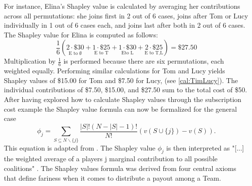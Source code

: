 \documentclass[12pt]{article}
\begin{document}
For instance, Elina's Shapley value is calculated by averaging her contributions across all permutations: she joins first in 2 out of 6 cases, joins after Tom or Lucy individually in 1 out of 6 cases each, and joins last after both in 2 out of 6 cases. The Shapley value for Elina is computed as follows:
$$
\frac{1}{6} \left( 
\underset{\text{E to } \emptyset}{2 \cdot \$30} + 
\underset{\text{E to T}}{1 \cdot \$25} + 
\underset{\text{Eto L}}{1 \cdot \$30} + 
\underset{\text{E to T,L}}{2 \cdot \$25} 
\right) = \$27.50
$$
Multiplication by $\frac{1}{6}$ is performed because there are six permutations, each weighted equally. Performing similar calculations for Tom and Lucy yields Shapley values of \$15.00 for Tom and \$7.50 for Lucy, (see \ref{cal:TimLucy}). The individual contributions of \$7.50, \$15.00, and \$27.50 sum to the total cost of \$50. 
After having explored how to calculate Shapley values through the subscription cost example the Shapley value formula can now be formalized for the general case
\begin{equation}
 \phi_j = \sum_{S \subseteq N\backslash\{j\}} \frac{|S|!(N - |S| - 1)!}{N!}(v(S \cup \{j\}) - v(S)) .
\end{equation}
This equation is adapted from \citet[Section~4.4]{molnarSHAP}.
The Shapley value $\phi_j$ is then interpreted as "[...] the weighted average of a players j marginal contribution to all possible coalitions" \citet[p.~26]{molnarSHAP}.
The Shapley values formula was derived from four central axioms that define fariness when it comes to distribute a payout among a Team.
\end{document}
